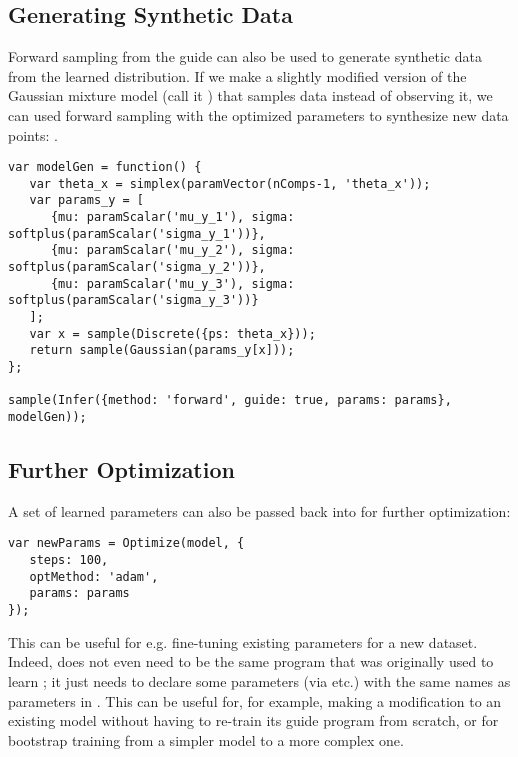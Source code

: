 \subsection{Generating Synthetic Data}

Forward sampling from the guide can also be used to generate synthetic data from the learned distribution. If we make a slightly modified version of the Gaussian mixture model (call it ) that samples data instead of observing it, we can used forward sampling with the optimized parameters  to synthesize new data points:
.
\begin{lstlisting}
var modelGen = function() {
   var theta_x = simplex(paramVector(nComps-1, 'theta_x'));
   var params_y = [
      {mu: paramScalar('mu_y_1'), sigma: softplus(paramScalar('sigma_y_1'))},
      {mu: paramScalar('mu_y_2'), sigma: softplus(paramScalar('sigma_y_2'))},
      {mu: paramScalar('mu_y_3'), sigma: softplus(paramScalar('sigma_y_3'))}
   ];
   var x = sample(Discrete({ps: theta_x}));
   return sample(Gaussian(params_y[x]));
};

sample(Infer({method: 'forward', guide: true, params: params}, modelGen));
\end{lstlisting}

\subsection{Further Optimization}
\label{sec:furtherOptim}

A set of learned parameters  can also be passed back into  for further optimization:
\begin{lstlisting}
var newParams = Optimize(model, {
   steps: 100,
   optMethod: 'adam',
   params: params
});
\end{lstlisting}
This can be useful for e.g. fine-tuning existing parameters for a new dataset. Indeed,  does not even need to be the same program that was originally used to learn ; it just needs to declare some parameters (via  etc.) with the same names as parameters in . This can be useful for, for example, making a modification to an existing model without having to re-train its guide program from scratch, or for bootstrap training from a simpler model to a more complex one.
